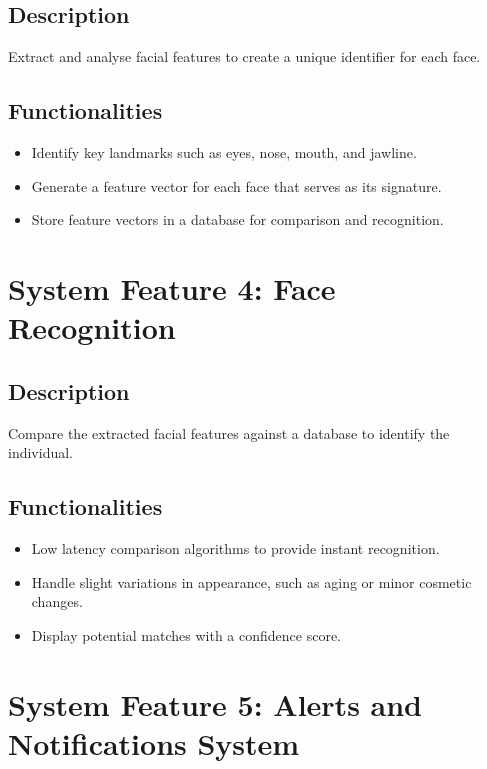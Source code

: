 \documentclass{scrreprt}
\begin{document}
            \subsection{Description}
            Extract and analyse facial features to create a unique identifier for each face.
            \subsection{Functionalities}
                \begin{itemize}
                    \item Identify key landmarks such as eyes, nose, mouth, and jawline.
                    \item Generate a feature vector for each face that serves as its signature.
                    \item Store feature vectors in a database for comparison and recognition.                
                \end{itemize}
        
                \section{System Feature 4: Face Recognition}   
                \subsection{Description}
                Compare the extracted facial features against a database to identify the individual.
                \subsection{Functionalities}
                    \begin{itemize}
                        \item Low latency comparison algorithms to provide instant recognition.
                        \item Handle slight variations in appearance, such as aging or minor cosmetic changes.
                        \item Display potential matches with a confidence score.
                                    
                    \end{itemize}
    
                    \section{System Feature 5: Alerts and Notifications System}   
\end{document}
